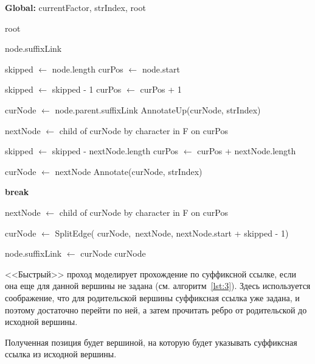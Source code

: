 \documentclass[14pt, russian]{scrartcl}
\begin{document}
\begin{algorithm}[H]
\caption{FastScan(node, start)}
\label{lst:3}
\scriptsize
\begin{algorithmic}[1]

\Statex \textbf{Global:} currentFactor, strIndex, root

    \State \Return root
\EndIf

    \State \Return node.suffixLink
\EndIf

\State skipped $\gets$ node.length
\State curPos $\gets$ node.start

  
    \State skipped $\gets$ skipped - 1
    \State curPos $\gets$ curPos + 1
\EndIf

\State curNode $\gets$ node.parent.suffixLink
\State AnnotateUp(curNode, strIndex)

\State nextNode $\gets$ child of curNode by character in F on curPos


    \State skipped $\gets$ skipped - nextNode.length
    \State curPos $\gets$ curPos + nextNode.length

    \State curNode $\gets$ nextNode
    \State Annotate(curNode, strIndex)

        \State \textbf{break}
    \EndIf

    \State nextNode $\gets$ child of curNode by character in F on curPos

\EndWhile

    \State curNode $\gets$ SplitEdge(
        curNode,\ nextNode, nextNode.start + skipped - 1)
\EndIf

\State node.suffixLink $\gets$ curNode
\State \Return curNode

\end{algorithmic}
\end{algorithm}


<<Быстрый>> проход моделирует прохождение по суффиксной ссылке, если она еще для данной вершины не задана (см. алгоритм~\ref{lst:3}). Здесь используется соображение, что для родительской вершины суффиксная ссылка уже задана, и поэтому достаточно перейти по ней, а затем прочитать ребро от родительской до исходной вершины.

Полученная позиция будет вершиной, на которую будет указывать суффиксная ссылка из исходной вершины.
\end{document}
